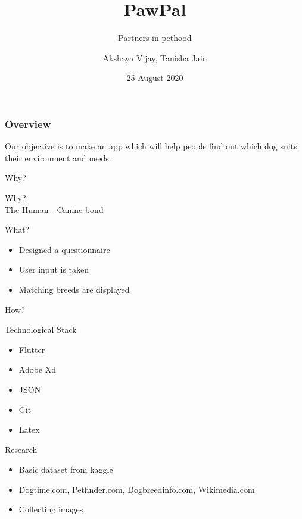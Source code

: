 \documentclass[14pt]{beamer}
\title[Pawpal]{PawPal}
\subtitle[Partners of pethood]{Partners in pethood}
\author[Team 42]{Akshaya Vijay, Tanisha Jain}
\date{25 August 2020}
\begin{document}
\begin{frame}
    \titlepage
\end{frame}


\begin{frame}
    \frametitle{Overview}
    Our objective is to make an app which will help people find out which dog suits their environment and needs. 
\end{frame}


\begin{frame}[Standout]
   Why?
\end{frame}

\begin{frame}[Standout]
   Why?
   \\The Human - Canine bond
\end{frame}

\begin{frame}[Standout]
   What?
\end{frame}

\begin{frame}
    \begin{itemize}
        \item Designed a questionnaire 
        \item User input is taken
        \item Matching breeds are displayed
    \end{itemize}
\end{frame}

\begin{frame}[Standout]
   How?
\end{frame}

\begin{frame}{Technological Stack}
    \begin{itemize}
        \item Flutter
        \item Adobe Xd
        \item JSON
        \item Git
        \item Latex
    \end{itemize}
\end{frame}

\begin{frame}{Research}
    \begin{itemize}
        \item Basic dataset from kaggle
        \item Dogtime.com, Petfinder.com, Dogbreedinfo.com, Wikimedia.com
        \item Collecting images 
    \end{itemize}
\end{frame}
\end{document}
